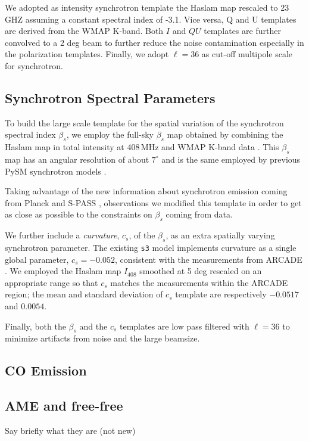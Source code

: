 We  adopted as  intensity synchrotron template the   Haslam map  rescaled to 23 GHZ assuming a constant spectral index of -3.1. Vice versa,  Q and U templates are derived from the WMAP K-band. Both $I$ and $QU$ templates are further convolved to a  2 deg beam to further reduce the noise contamination especially in the polarization templates. Finally, we  adopt $\ell = 36$ as  cut-off multipole scale  for synchrotron.  

\subsection{Synchrotron Spectral Parameters}
To build the large scale template for the spatial variation of the synchrotron spectral index $\beta_s$, we employ the full-sky $\beta_s$ map obtained by combining the Haslam map in total intensity at 408\,MHz \citep{Remazeilles:2014} and WMAP K-band data \citep{mivilledeschenes:2008}. This $\beta_s$ map has an angular resolution of about $7^{\circ}$ and is the same employed by previous PySM synchrotron models \citep{Thorne:2017}. 

Taking advantage of the new information about synchrotron emission coming from Planck and S-PASS \citet{Krachmalnicoff:2018}, observations we modified this template in order to get as close as possible to the constraints on $\beta_s$ coming from data.
 
We further include a \emph{curvature}, $c_s$,  of the  $\beta_s$, as an extra spatially varying synchrotron parameter. The existing \texttt{s3} model  implements curvature as a single global parameter, $c_s = -0.052 $, consistent with the measurements from ARCADE \citep[$c_s=-0.052 \pm 0.005$][]{Kogut:2012}. We employed the Haslam map $I_{408}$ smoothed at 5 deg rescaled on an  appropriate range so that $c_s$ matches the \citet{Kogut:2012} measurements within the ARCADE region; the mean and standard deviation of $c_s$ template are respectively $-0.0517$ and $0.0054$. 

Finally, both the $\beta_s$ and the $c_s$ templates are low pass filtered with $\ell=36$ to minimize artifacts from noise and the large beamsize.

\subsection{CO Emission}


\subsection{AME and free-free}

Say briefly what they are (not new)